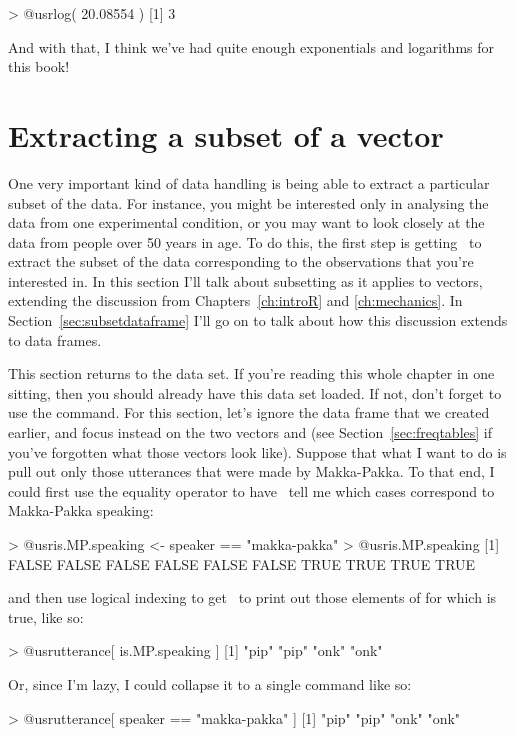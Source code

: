 \begin{rblock1}
> @usr{log( 20.08554 )}
[1] 3
\end{rblock1}
And with that, I think we've had quite enough exponentials and logarithms for this book! 


\section{Extracting a subset of a vector~\label{sec:subset}}

One very important kind of data handling is being able to extract a particular subset of the data. For instance, you might be interested only in analysing the data from one experimental condition, or you may want to look closely at the data from people over 50 years in age. To do this, the first step is getting \R\ to extract the subset of the data corresponding to the observations that you're interested in. In this section I'll talk about subsetting as it applies to vectors, extending the discussion from Chapters~\ref{ch:introR} and \ref{ch:mechanics}. In Section~\ref{sec:subsetdataframe} I'll go on to talk about how this discussion extends to  data frames.


This section returns to the  data set. If you're reading this whole chapter in one sitting, then you should already have this data set loaded. If not, don't forget to use the  command. For this section, let's ignore the  data frame that we  created earlier, and focus instead on the two vectors  and  (see Section~\ref{sec:freqtables} if you've forgotten what those vectors look like). Suppose that what I want to do is pull out only those utterances that were made by Makka-Pakka. To that end, I could first use the equality operator to have \R\ tell me which cases correspond to Makka-Pakka speaking:
\begin{rblock1}
> @usr{is.MP.speaking <- speaker == "makka-pakka"}
> @usr{is.MP.speaking}
 [1] FALSE FALSE FALSE FALSE FALSE FALSE  TRUE  TRUE  TRUE  TRUE
\end{rblock1}
and then use logical indexing to get \R\ to print out those elements of  for which  is true, like so:
\begin{rblock1}
> @usr{utterance[ is.MP.speaking ]}
[1] "pip" "pip" "onk" "onk"
\end{rblock1}
Or, since I'm lazy, I could collapse it to a single command like so:
\begin{rblock1}
> @usr{utterance[ speaker == "makka-pakka" ]}
[1] "pip" "pip" "onk" "onk"
\end{rblock1}

